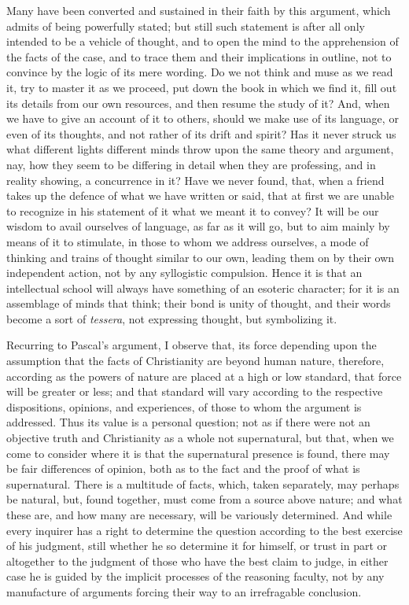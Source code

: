 Many have been converted and sustained in their faith by this
argument, which admits of being powerfully stated; but still such
statement is after all only intended to be a vehicle of thought, and
to open the mind to the apprehension of the facts of the case, and to
trace them and their implications in outline, not to convince by the
logic of its mere wording. Do we not think and muse as we read it, try
to master it as we proceed, put down the book in which we find it,
fill out its details from our own resources, and then resume the study
of it? And, when we have to give an account of it to others, should we
make use of its language, or even of its thoughts, and not rather of
its drift and spirit? Has it never struck us what different lights
different minds throw upon the same theory and argument, nay, how they
seem to be differing in detail when they are professing, and in
reality showing, a concurrence in it? Have we never found, that, when
a friend takes up the defence of what we have written or said, that at
first we are unable to recognize in his statement of it what we meant
it to convey? It will be our wisdom to avail ourselves of language, as
far as it will go, but to aim mainly by means of it to stimulate, in
those to whom we address ourselves, a mode of thinking and trains of
thought similar to our own, leading them on by their own independent
action, not by any syllogistic compulsion. Hence it is that an
intellectual school will always have something of an esoteric
character; for it is an assemblage of minds that think; their bond is
unity of thought, and their words become a sort of \emph{tessera}, not
expressing thought, but symbolizing it.

Recurring to Pascal's argument, I observe that, its force depending
upon the assumption that the facts of Christianity are beyond human
nature, therefore, according as the powers of nature are placed at a
high or low standard, that force will be greater or less; and that
standard will vary according to the respective dispositions, opinions,
and experiences, of those to whom the argument is addressed. Thus its
value is a personal question; not as if there were not an objective
truth and Christianity as a whole not supernatural, but that, when we
come to consider where it is that the supernatural presence is found,
there may be fair differences of opinion, both as to the fact and the
proof of what is supernatural. There is a multitude of facts, which,
taken separately, may perhaps be natural, but, found together, must
come from a source above nature; and what these are, and how many are
necessary, will be variously determined. And while every inquirer has
a right to determine the question according to the best exercise of
his judgment, still whether he so determine it for himself, or trust in
part or altogether to the judgment of those who have the best claim to
judge, in either case he is guided by the implicit processes of the
reasoning faculty, not by any manufacture of arguments forcing their
way to an irrefragable conclusion.

